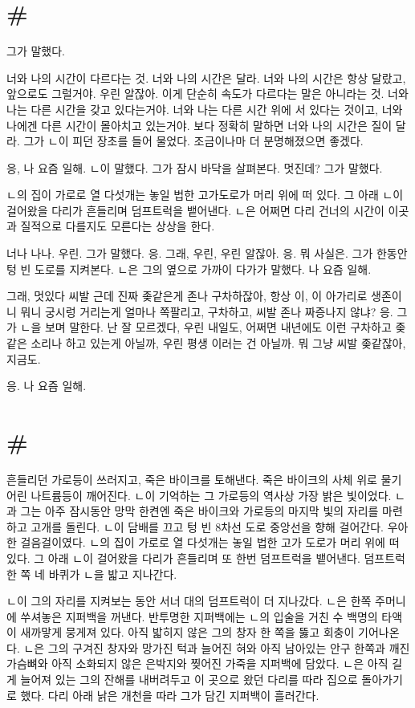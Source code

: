 \documentclass[a5paper,10pt, twoside, openright]{memoir}
\begin{document}
	\section{\#}
	그가 말했다. 

	너와 나의 시간이 다르다는 것. 너와 나의 시간은 달라. 너와 나의 시간은 항상 달랐고, 앞으로도 그럴거야. 우린 알잖아. 이게 단순히 속도가 다르다는 말은 아니라는 것. 너와 나는 다른 시간을 갖고 있다는거야. 너와 나는 다른 시간 위에 서 있다는 것이고, 너와 나에겐 다른 시간이 몰아치고 있는거야. 보다 정확히 말하면 너와 나의 시간은 질이 달라. 그가 ㄴ이 피던 장초를 들어 물었다. 조금이나마 더 분명해졌으면 좋겠다. 

	응, 나 요즘 일해. ㄴ이 말했다. 그가 잠시 바닥을 살펴본다. 멋진데? 그가 말했다. 

	ㄴ의 집이 가로로 열 다섯개는 놓일 법한 고가도로가 머리 위에 떠 있다. 그 아래 ㄴ이 걸어왔을 다리가 흔들리며 덤프트럭을 뱉어낸다. ㄴ은 어쩌면 다리 건너의 시간이 이곳과 질적으로 다를지도 모른다는 상상을 한다. 

	너나 나나. 우린. 그가 말했다. 응. 그래, 우린, 우린 알잖아. 응. 뭐 사실은. 그가 한동안 텅 빈 도로를 지켜본다. ㄴ은 그의 옆으로 가까이 다가가 말했다. 나 요즘 일해. 

	그래, 멋있다 씨발 근데 진짜 좆같은게 존나 구차하잖아, 항상 이, 이 아가리로 생존이니 뭐니 궁시렁 거리는게 얼마나 쪽팔리고, 구차하고, 씨발 존나 짜증나지 않냐? 응. 그가 ㄴ을 보며 말한다. 난 잘 모르겠다, 우린 내일도, 어쩌면 내년에도 이런 구차하고 좆같은 소리나 하고 있는게 아닐까, 우린 평생 이러는 건 아닐까. 뭐 그냥 씨발 좆같잖아, 지금도. 

	응. 나 요즘 일해.

	\section{\#}
	흔들리던 가로등이 쓰러지고, 죽은 바이크를 토해낸다. 죽은 바이크의 사체 위로 물기 어린 나트륨등이 깨어진다. ㄴ이 기억하는 그 가로등의 역사상 가장 밝은 빛이었다. ㄴ과 그는 아주 잠시동안 망막 한켠엔 죽은 바이크와 가로등의 마지막 빛의 자리를 마련하고 고개를 돌린다. ㄴ이 담배를 끄고 텅 빈 8차선 도로 중앙선을 향해 걸어간다. 우아한 걸음걸이였다. ㄴ의 집이 가로로 열 다섯개는 놓일 법한 고가 도로가 머리 위에 떠 있다. 그 아래 ㄴ이 걸어왔을 다리가 흔들리며 또 한번 덤프트럭을 뱉어낸다. 덤프트럭 한 쪽 네 바퀴가 ㄴ을 밟고 지나간다. 

	ㄴ이 그의 자리를 지켜보는 동안 서너 대의 덤프트럭이 더 지나갔다. ㄴ은 한쪽 주머니에 쑤셔놓은 지퍼백을 꺼낸다. 반투명한 지퍼백에는 ㄴ의 입술을 거친 수 백명의 타액이 새까맣게 뭉게져 있다. 아직 밟히지 않은 그의 창자 한 쪽을 뚫고 회충이 기어나온다. ㄴ은 그의 구겨진 창자와 망가진 턱과 늘어진 혀와 아직 남아있는 안구 한쪽과 깨진 가슴뼈와 아직 소화되지 않은 은박지와 찢어진 가죽을 지퍼백에 담았다. ㄴ은 아직 길게 늘어져 있는 그의 잔해를 내버려두고 이 곳으로 왔던 다리를 따라 집으로 돌아가기로 했다. 다리 아래 낡은 개천을 따라 그가 담긴 지퍼백이 흘러간다.
\end{document}
